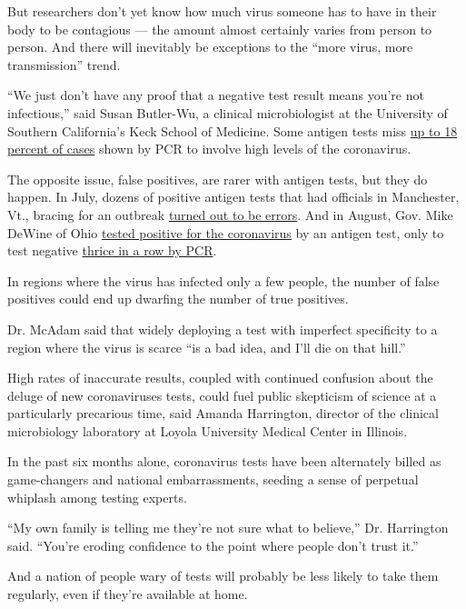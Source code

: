 But researchers don't yet know how much virus someone has to have in
their body to be contagious --- the amount almost certainly varies from
person to person. And there will inevitably be exceptions to the ``more
virus, more transmission'' trend.

``We just don't have any proof that a negative test result means you're
not infectious,'' said Susan Butler-Wu, a clinical microbiologist at the
University of Southern California's Keck School of Medicine. Some
antigen tests miss
\href{https://www.ncbi.nlm.nih.gov/pmc/articles/PMC7383555/}{up to 18
percent of cases} shown by PCR to involve high levels of the
coronavirus.

The opposite issue, false positives, are rarer with antigen tests, but
they do happen. In July, dozens of positive antigen tests that had
officials in Manchester, Vt., bracing for an outbreak
\href{https://www.burlingtonfreepress.com/story/news/2020/07/23/covid-19-testing-how-versions-differ-speed-use-and-accuracy-coronavirus/5446176002/}{turned
out to be errors}. And in August, Gov. Mike DeWine of Ohio
\href{https://www.nytimes3xbfgragh.onion/2020/08/06/us/mike-dewine-coronavirus.html}{tested
positive for the coronavirus} by an antigen test, only to test negative
\href{https://www.nytimes3xbfgragh.onion/2020/08/09/health/covid-testing.html}{thrice
in a row by PCR}.

In regions where the virus has infected only a few people, the number of
false positives could end up dwarfing the number of true positives.

Dr. McAdam said that widely deploying a test with imperfect specificity
to a region where the virus is scarce ``is a bad idea, and I'll die on
that hill.''

High rates of inaccurate results, coupled with continued confusion about
the deluge of new coronaviruses tests, could fuel public skepticism of
science at a particularly precarious time, said Amanda Harrington,
director of the clinical microbiology laboratory at Loyola University
Medical Center in Illinois.

In the past six months alone, coronavirus tests have been alternately
billed as game-changers and national embarrassments, seeding a sense of
perpetual whiplash among testing experts.

``My own family is telling me they're not sure what to believe,'' Dr.
Harrington said. ``You're eroding confidence to the point where people
don't trust it.''

And a nation of people wary of tests will probably be less likely to
take them regularly, even if they're available at home.

